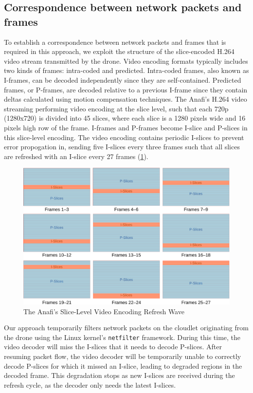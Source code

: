 \subsection{Correspondence between network packets and frames}

To establish a correspondence between network packets and frames that is
required in this approach, we exploit the structure of the slice-encoded H.264
video stream transmitted by the drone. Video encoding formats typically
includes two kinds of frames: intra-coded and predicted.  Intra-coded frames,
also known as I-frames, can be decoded independently since they are
self-contained. Predicted frames, or P-frames, are decoded relative to a
previous I-frame since they contain deltas calculated using motion compensation
techniques. The Anafi's H.264 video streaming performing video encoding at the
slice level, such that each 720p (1280x720) is divided into 45 slices, where
each slice is a 1280 pixels wide and 16 pixels high row of the frame.  I-frames
and P-frames become I-slice and P-slices in this slice-level encoding.  The
video encoding contains periodic I-slices to prevent error propogation in,
sending five I-slices every three frames such that all slices are refreshed
with an I-slice every 27 frames (\cref{fig:slice-encoding}).

\begin{figure}[htbp]
    \centerline{\includegraphics[width = .8\textwidth]{figs/fig-slice-encoding-crop.pdf}}
    \caption{The Anafi's Slice-Level Video Encoding Refresh Wave}
\label{fig:slice-encoding}
\end{figure}

Our approach temporarily filters network packets on the cloudlet originating
from the drone using the Linux kernel's \texttt{netfilter} framework. During
this time, the video decoder will miss the I-slices that it needs to decode
P-slices. After resuming packet flow, the video decoder will be temporarily
unable to correctly decode P-slices for which it missed an I-slice, leading to
degraded regions in the decoded frame. This degradation stops as new I-slices
are received during the refresh cycle, as the decoder only needs the latest
I-slices.

